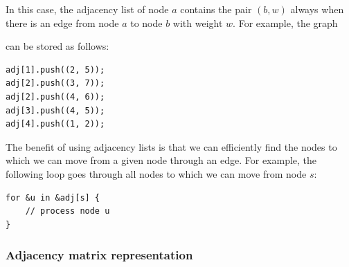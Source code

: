 In this case, the adjacency list of node $a$
contains the pair $(b,w)$
always when there is an edge from node $a$ to node $b$
with weight $w$. For example, the graph

\begin{center}
\end{center}
can be stored as follows:
\begin{lstlisting}
adj[1].push((2, 5));
adj[2].push((3, 7));
adj[2].push((4, 6));
adj[3].push((4, 5));
adj[4].push((1, 2));
\end{lstlisting}

The benefit of using adjacency lists is that
we can efficiently find the nodes to which
we can move from a given node through an edge.
For example, the following loop goes through all nodes
to which we can move from node $s$:

\begin{lstlisting}
for &u in &adj[s] {
    // process node u
}
\end{lstlisting}

\subsubsection{Adjacency matrix representation}



